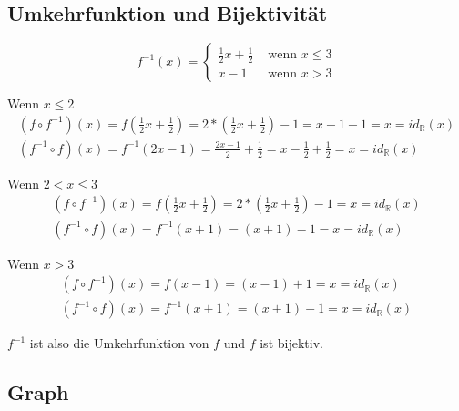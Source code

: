 \documentclass[a4paper,10pt]{article}
\begin{document}
\subsection*{Umkehrfunktion und Bijektivität}

\begin{equation}
 f^{-1}(x) = \begin{cases}
              \frac{1}{2} x + \frac{1}{2} & \text{ wenn $x \le 3$}\\
              x - 1 & \text{ wenn $x > 3$}
             \end{cases}
\end{equation}

Wenn $x \le 2$
\begin{align}
 (f \circ f^{-1})(x) = f(\frac{1}{2} x + \frac{1}{2}) = 2 * (\frac{1}{2} x + \frac{1}{2}) - 1 = x + 1 - 1 = x = id_\mathbb{R}(x)\\
 (f^{-1} \circ f)(x) = f^{-1}(2x - 1) = \frac{2x - 1}{2} + \frac{1}{2} = x - \frac{1}{2} + \frac{1}{2} = x = id_\mathbb{R}(x)
\end{align}

Wenn $2 < x \le 3$
\begin{align}
 (f \circ f^{-1})(x) = f(\frac{1}{2} x + \frac{1}{2}) = 2 * (\frac{1}{2} x + \frac{1}{2}) - 1 = x = id_\mathbb{R}(x)\\
 (f^{-1} \circ f)(x) = f^{-1}(x + 1) = (x + 1) - 1 = x = id_\mathbb{R}(x)
\end{align}

Wenn $x > 3$
\begin{align}
 (f \circ f^{-1})(x) = f(x - 1) = (x - 1) + 1 = x = id_\mathbb{R}(x)\\
 (f^{-1} \circ f)(x) = f^{-1}(x + 1) = (x + 1) - 1 = x = id_\mathbb{R}(x)
\end{align}

$f^{-1}$ ist also die Umkehrfunktion von $f$ und $f$ ist bijektiv.

\subsection*{Graph}
\end{document}

